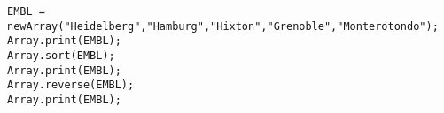 \begin{lstlisting}[numbers=none]
EMBL = newArray("Heidelberg","Hamburg","Hixton","Grenoble","Monterotondo");
Array.print(EMBL);
Array.sort(EMBL);
Array.print(EMBL);
Array.reverse(EMBL);
Array.print(EMBL);

\end{lstlisting}